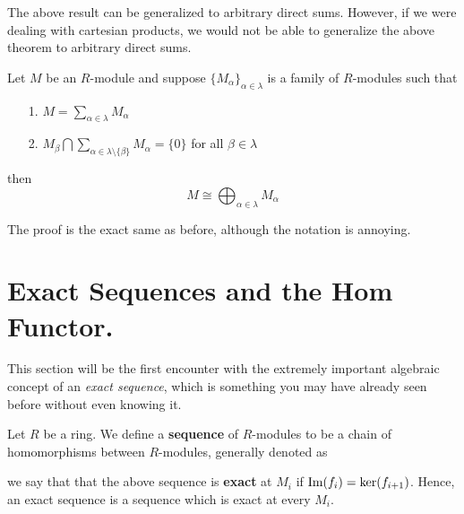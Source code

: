The above result can be generalized to arbitrary direct sums. However, if we
were dealing with cartesian products, we would not be able to
generalize the above theorem to arbitrary direct sums. 

\begin{thm}
    Let $M$ be an $R$-module and suppose $\{M_\alpha\}_{\alpha \in
    \lambda}$ is a family of $R$-modules such that 
    \begin{itemize}
        \item[1.] $\displaystyle M = \sum_{\alpha \in \lambda}
        M_\alpha$ 
        \item[2.] $M_\beta \bigcap \displaystyle  \sum_{\alpha \in
        \lambda\setminus\{\beta\}}M_\alpha = \{0\}$ for all $\beta
        \in \lambda$
    \end{itemize}
    then 
    \[
        M \cong \bigoplus_{\alpha \in \lambda}M_{\alpha}
    \]
    \vspace{-0.7cm}
\end{thm}

The proof is the exact same as before, although the notation is
annoying. 


\newpage
\section{Exact Sequences and the Hom Functor.}

This section will be the first encounter with the extremely
important algebraic concept of an \textit{exact sequence}, which
is something you may have already seen before without even knowing
it. 

\begin{definition}
    Let $R$ be a ring. We define a \textbf{sequence} of
    $R$-modules to be a chain of homomorphisms between
    $R$-modules, generally denoted as
    \begin{center}
    \end{center}
    we say that that the above sequence is \textbf{exact} at $M_i$
    if $\mbox{Im}(f_i) = \ker(f_{i+1})$. Hence, an exact sequence is a
    sequence which is exact at every $M_i$. 
\end{definition}

